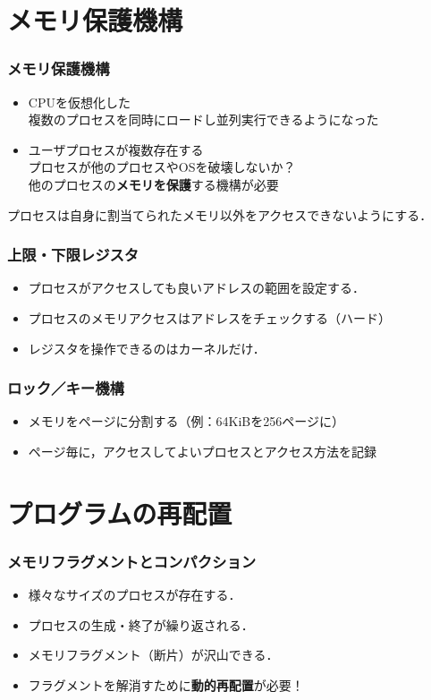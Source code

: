 \documentclass{beamer}                   %
\begin{document}
\section{メモリ保護機構}
\begin{frame}
  \frametitle{メモリ保護機構}
  \begin{itemize}
    \item CPUを仮想化した\\
      複数のプロセスを同時にロードし並列実行できるようになった
    \item ユーザプロセスが複数存在する \\
      プロセスが他のプロセスやOSを破壊しないか？\\
      他のプロセスの{\bf メモリを保護}する機構が必要
  \end{itemize}
  プロセスは自身に割当てられたメモリ以外をアクセスできないようにする．
\end{frame}

\begin{frame}
  \frametitle{上限・下限レジスタ}
  \begin{itemize}
    \item プロセスがアクセスしても良いアドレスの範囲を設定する．
    \item プロセスのメモリアクセスはアドレスをチェックする（ハード）
    \item レジスタを操作できるのはカーネルだけ．
  \end{itemize}
\end{frame}

\begin{frame}
  \frametitle{ロック／キー機構}
  \begin{itemize}
    \item メモリをページに分割する（例：64KiBを256ページに）
    \item ページ毎に，アクセスしてよいプロセスとアクセス方法を記録
  \end{itemize}
\end{frame}

\section{プログラムの再配置}
\begin{frame}
  \frametitle{メモリフラグメントとコンパクション}
  \begin{itemize}
    \item 様々なサイズのプロセスが存在する．
    \item プロセスの生成・終了が繰り返される．
    \item メモリフラグメント（断片）が沢山できる．
    \item フラグメントを解消すために{\bf 動的再配置}が必要！
  \end{itemize}
\end{frame}
\end{document}
